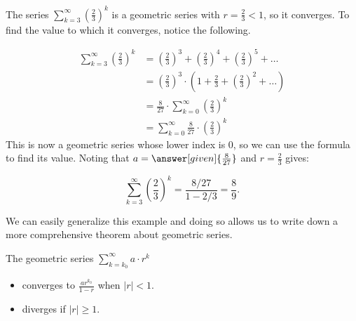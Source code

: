 \documentclass{ximera}
\begin{document}
\begin{example}
The series $\sum_{k=3}^{\infty} \left(\frac{2}{3}\right)^k$ is a geometric series with $r=\frac{2}{3}<1$, so it converges.  To find the value to which it converges, notice the following.

\begin{align*}
\sum_{k=3}^{\infty} \left(\frac{2}{3}\right)^k &=  \left(\frac{2}{3}\right)^3+ \left(\frac{2}{3}\right)^4+ \left(\frac{2}{3}\right)^5+\ldots \\
&= \left(\frac{2}{3}\right)^3 \cdot \left(1+ \frac{2}{3}+ \left(\frac{2}{3}\right)^2+\ldots\right) \\
&= \frac{8}{27}  \cdot  \sum_{k=0}^{\infty}\left(\frac{2}{3}\right)^k \\
&= \sum_{k=0}^{\infty} \frac{8}{27}  \cdot \left(\frac{2}{3}\right)^k
\end{align*}
This is now a geometric series whose lower index is $0$, so we can use the formula to find its value. Noting that $a=\answer[given]{ \frac{8}{27} }$ and $r= \frac{2}{3}$ gives:

\[
\sum_{k=3}^{\infty} \left(\frac{2}{3}\right)^k = \frac{8/27}{1-2/3} = \frac{8}{9}.
\]
\end{example}

We can easily generalize this example and doing so allows us to write down a more comprehensive theorem about geometric series.

\begin{theorem}
  The geometric series $\sum_{k= k_0}^\infty a \cdot r^k$ 
  
  \begin{itemize} 
  \item converges to $\frac{ar^{k_0}}{1-r}$ when $|r| < 1$.
  \item diverges if $|r| \geq 1$.  
  \end{itemize}
  \end{theorem}
  
  
%
\end{document}
